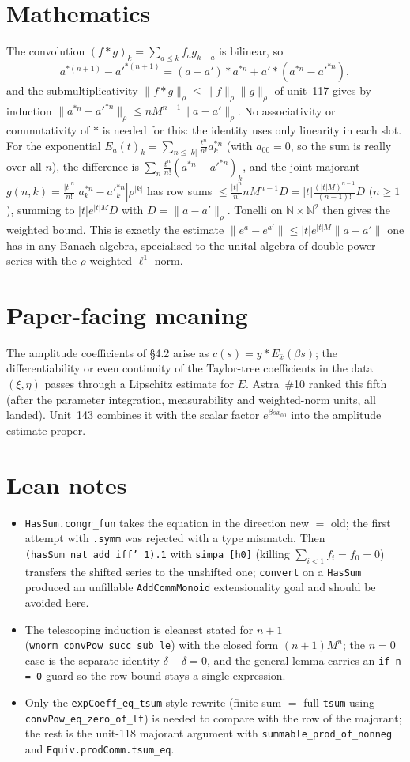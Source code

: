 \documentclass[11pt]{article}
\begin{document}
\section{Mathematics}
The convolution $(f*g)_k=\sum_{a\le k}f_a g_{k-a}$ is bilinear, so
\[
a^{*(n+1)}-a'^{*(n+1)}=(a-a')*a^{*n}+a'*(a^{*n}-a'^{*n}),
\]
and the submultiplicativity $\|f*g\|_\rho\le\|f\|_\rho\|g\|_\rho$ of unit~117 gives by induction
$\|a^{*n}-a'^{*n}\|_\rho\le nM^{n-1}\|a-a'\|_\rho$. No associativity or commutativity of $*$ is
needed for this: the identity uses only linearity in each slot. For the exponential
$E_a(t)_k=\sum_{n\le|k|}\frac{t^n}{n!}a^{*n}_k$ (with $a_{00}=0$, so the sum is really over all $n$),
the difference is $\sum_n\frac{t^n}{n!}(a^{*n}-a'^{*n})_k$, and the joint majorant
$g(n,k)=\frac{|t|^n}{n!}|a^{*n}_k-a'^{*n}_k|\rho^{|k|}$ has row sums
$\le\frac{|t|^n}{n!}nM^{n-1}D=|t|\frac{(|t|M)^{n-1}}{(n-1)!}D$ ($n\ge1$), summing to
$|t|e^{|t|M}D$ with $D=\|a-a'\|_\rho$. Tonelli on $\mathbb N\times\mathbb N^2$ then gives the
weighted bound. This is exactly the estimate $\|e^{a}-e^{a'}\|\le|t|e^{|t|M}\|a-a'\|$ one has in any
Banach algebra, specialised to the unital algebra of double power series with the $\rho$-weighted
$\ell^1$ norm.

\section{Paper-facing meaning}
The amplitude coefficients of §4.2 arise as $c(s)=y*E_{\bar x}(\beta s)$; the differentiability or
even continuity of the Taylor-tree coefficients in the data $(\xi,\eta)$ passes through a Lipschitz
estimate for $E$. Astra~\#10 ranked this fifth (after the parameter integration, measurability and
weighted-norm units, all landed). Unit~143 combines it with the scalar factor $e^{\beta s x_{00}}$
into the amplitude estimate proper.

\section{Lean notes}
\begin{itemize}
\item \texttt{HasSum.congr\_fun} takes the equation in the direction new $=$ old; the first attempt
with \texttt{.symm} was rejected with a type mismatch. Then \texttt{(hasSum\_nat\_add\_iff' 1).1}
with \texttt{simpa [h0]} (killing $\sum_{i<1}f_i=f_0=0$) transfers the shifted series to the
unshifted one; \texttt{convert} on a \texttt{HasSum} produced an unfillable
\texttt{AddCommMonoid} extensionality goal and should be avoided here.
\item The telescoping induction is cleanest stated for $n+1$ (\texttt{wnorm\_convPow\_succ\_sub\_le})
with the closed form $(n+1)M^n$; the $n=0$ case is the separate identity $\delta-\delta=0$, and the
general lemma carries an \texttt{if n = 0} guard so the row bound stays a single expression.
\item Only the \texttt{expCoeff\_eq\_tsum}-style rewrite (finite sum $=$ full \texttt{tsum} using
\texttt{convPow\_eq\_zero\_of\_lt}) is needed to compare with the row of the majorant; the rest is
the unit-118 majorant argument with \texttt{summable\_prod\_of\_nonneg} and
\texttt{Equiv.prodComm.tsum\_eq}.
\end{itemize}
\end{document}

